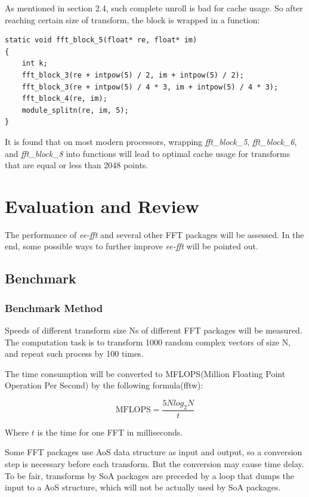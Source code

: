 \documentclass[a4paper]{report}
\begin{document}
	As mentioned in section 2.4, such complete unroll is bad for cache usage. So after reaching certain size of transform, the block is wrapped in a function:
	
    \lstset{language = c, tabsize = 4}
    \begin{lstlisting}
static void fft_block_5(float* re, float* im)
{
    int k;
    fft_block_3(re + intpow(5) / 2, im + intpow(5) / 2);
    fft_block_3(re + intpow(5) / 4 * 3, im + intpow(5) / 4 * 3);
    fft_block_4(re, im);
    module_splitn(re, im, 5);
}
    \end{lstlisting}
	
	It is found that on most modern processors, wrapping \textit{fft\_block\_5}, \textit{fft\_block\_6}, and \textit{fft\_block\_8} into functions will lead to optimal cache usage for transforms that are equal or less than 2048 points.

\chapter{Evaluation and Review} \indent

	The performance of \textit{ee-fft} and several other FFT packages will be assessed. In the end, some possible ways to further improve \textit{ee-fft} will be pointed out.

\section{Benchmark} \indent

\subsection{Benchmark Method} \indent

	Speeds of different transform size Ns of different FFT packages will be measured. The computation task is to transform 1000 random complex vectors of size N, and repeat such process by 100 times.
	
	The time consumption will be converted to MFLOPS(Million Floating Point Operation Per Second) by the following formula(fftw):
	
	\[\text{MFLOPS} = \frac{5Nlog_2N}{t}\]
	
	Where $t$ is the time for one FFT in milliseconds.
	
	Some FFT packages use AoS data structure as input and output, so a conversion step is necessary before each transform. But the conversion may cause time delay. To be fair, transforms by SoA packages are preceded by a loop that dumps the input to a AoS structure, which will not be actually used by SoA packages.
\end{document}
